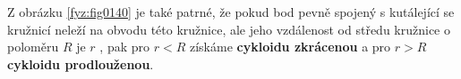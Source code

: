 \begin{mdframed}[style=mdexam]
\begin{example}
    Z obrázku \ref{fyz:fig0140} je také patrné, že pokud bod pevně spojený s kutálející se kružnicí 
    neleží na obvodu této kružnice, ale jeho vzdálenost od středu kružnice o poloměru \(R\)  je 
    \(r\) , pak pro \(r<R\) získáme \textbf{cykloidu zkrácenou} a pro \(r>R\)  \textbf{cykloidu 
    prodlouženou}.
      
    

  \end{example}
\end{mdframed}
